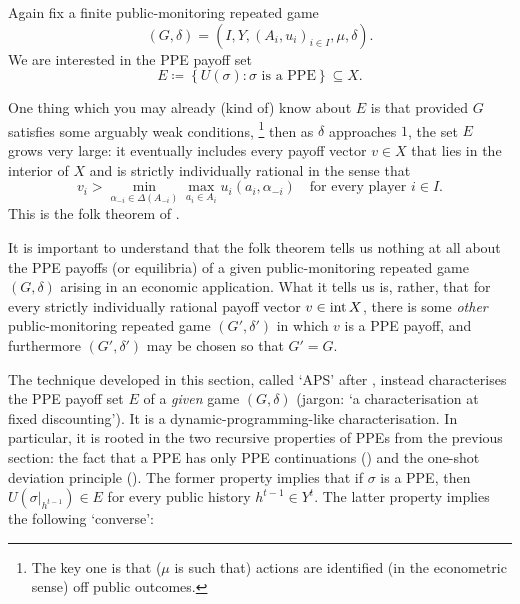Again fix a finite public-monitoring repeated game
%
\begin{equation*}
	(G,\delta) = \left( I, Y, (A_i, u_i)_{i \in I}, \mu, \delta \right) .
\end{equation*}
%
We are interested in the PPE payoff set
%
\begin{equation*}
	E \coloneqq 
	\left\{
	U(\sigma) : \text{$\sigma$ is a PPE}
	\right\}
	\subseteq X .
\end{equation*}

One thing which you may already (kind of) know about $E$ is that provided $G$ satisfies some arguably weak conditions,%
	\footnote{The key one is that ($\mu$ is such that) actions are identified (in the econometric sense) off public outcomes.}
then as $\delta$ approaches $1$, the set $E$ grows very large: it eventually includes every payoff vector $v \in X$ that lies in the interior of $X$ and is strictly individually rational in the sense that
%
\begin{equation*}
	v_i > \min_{\alpha_{-i} \in \Delta(A_{-i})} \max_{a_i \in A_i} u_i(a_i,\alpha_{-i})
	\quad \text{for every player $i \in I$.}
\end{equation*}
%
This is the folk theorem of \textcite{FudenbergLevineMaskin1994} \parencite[see][chapter~9]{MailathSamuelson2006}.

It is important to understand that the folk theorem tells us nothing at all about the PPE payoffs (or equilibria) of a given public-monitoring repeated game $(G,\delta)$ arising in an economic application. What it tells us is, rather, that for every strictly individually rational payoff vector $v \in \operatorname*{int} X$, there is some \emph{other} public-monitoring repeated game $(G',\delta')$ in which $v$ is a PPE payoff, and furthermore $(G',\delta')$ may be chosen so that $G'=G$.

The technique developed in this section, called `APS' after \textcite{AbreuPearceStacchetti1990}, instead characterises the PPE payoff set $E$ of a \emph{given} game $(G,\delta)$ (jargon: `a characterisation at fixed discounting'). It is a dynamic-programming-like characterisation. In particular, it is rooted in the two recursive properties of PPEs from the previous section: the fact that a PPE has only PPE continuations () and the one-shot deviation principle (). The former property implies that if $\sigma$ is a PPE, then $U\left( \sigma|_{h^{t-1}} \right) \in E$ for every public history $h^{t-1} \in Y^t$. The latter property implies the following `converse':

